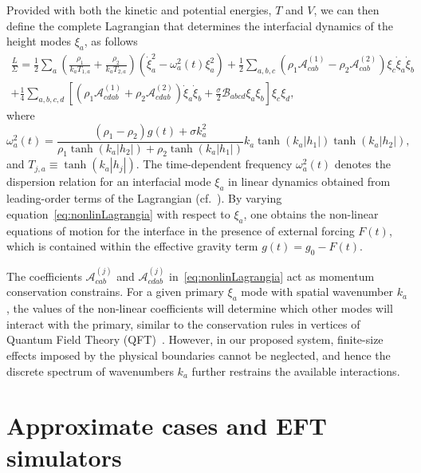 \documentclass[a4paper]{jpconf}
\newcommand{\pow}[2]{#1^{(#2)}}
\begin{document}
Provided with both the kinetic and potential energies, $T$ and $V$, we can then define the complete Lagrangian that determines the interfacial dynamics of the height modes $\xi_a$, as follows
\begin{multline}
\label{eq:nonlinLagrangia}
    \frac{L}{\Sigma}
    =\frac{1}{2}\sum_a\left(\frac{\rho_1}{k_aT_{1,a}}+\frac{\rho_2}{k_aT_{2,a}}\right)\left(\dot{\xi}_a^2-\omega_a^2(t)\xi_a^2\right)
    +\frac{1}{2}\sum_{a,b,c}\left(\rho_1\pow{\mathcal{A}}{1}_{cab}-\rho_2\pow{\mathcal{A}}{2}_{cab}\right)\xi_c\dot{\xi}_a\dot{\xi}_b\\
    +\frac{1}{4}\sum_{a,b,c,d}\left[\left(\rho_1\pow{\mathcal{A}}{1}_{cdab}
        +\rho_2\pow{\mathcal{A}}{2}_{cdab}\right)\dot{\xi}_a\dot{\xi}_b
        +\frac{\sigma}{2}\mathcal{B}_{abcd}\xi_a\xi_b\right]\xi_c\xi_d,
\end{multline}
where
\begin{equation}
\label{eq:dispersion}
    \omega_a^2(t)=\frac{(\rho_1-\rho_2)g(t)+\sigma k_a^2}{\rho_1\tanh(k_a|h_2|)+\rho_2\tanh(k_a|h_1|)}k_a\tanh(k_a|h_1|)\tanh(k_a|h_2|),
\end{equation}
and $T_{j,a}\equiv \tanh(k_a|h_j|)$. The time-dependent frequency $\omega_a^2(t)$ denotes the dispersion relation for an interfacial mode $\xi_a$ in linear dynamics obtained from leading-order terms of the Lagrangian (cf.~\cite{Kumar94}). By varying equation~\eqref{eq:nonlinLagrangia} with respect to $\xi_a$, one obtains the non-linear equations of motion for the interface in the presence of external forcing $F(t)$, which is contained within the effective gravity term $g(t)=g_0-F(t)$.

The coefficients $\mathcal{A}^{(j)}_{cab}$ and $\mathcal{A}^{(j)}_{cdab}$ in~\eqref{eq:nonlinLagrangia}  act as momentum conservation constrains. For a given primary $\xi_a$ mode with spatial wavenumber $k_a$, the values of the non-linear coefficients will determine which other modes will interact with the primary, similar to the conservation rules in vertices of Quantum Field Theory (QFT)~\cite{peskin2018introduction}. However, in our proposed system, finite-size effects imposed by the physical boundaries cannot be neglected, and hence the discrete spectrum of wavenumbers $k_a$ further restrains the available interactions. 

\section{Approximate cases and EFT simulators}\label{sec:simulators}
\end{document}
